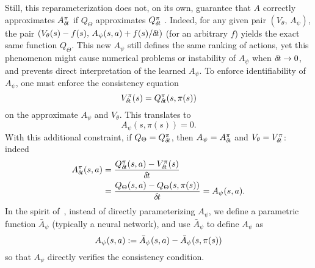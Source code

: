 Still, this reparameterization does not, on its own, guarantee that $A$
correctly approximates $A^\pi_{\delta\hspace{-.1em}t}$ if
$Q_\Theta$ approximates $Q^\pi_{\delta\hspace{-.1em}t}$%
.
Indeed, for any given pair $(V_\theta,\,A_\psi)$, the pair $(V_\theta(s) -
f(s),\,A_\psi(s,a)+f(s)/{\delta\hspace{-.1em}t})$ (for an arbitrary $f$)
yields the exact same function $Q_\Theta$. This new $A_\psi$ still defines %
the same ranking of actions, yet this phenomenon might cause
numerical problems or instability of $A_\psi$ when ${\delta\hspace{-.1em}t}\to 0$, and prevents direct
interpretation of the learned $A_\psi$.
To enforce identifiability of $A_\psi$, one must enforce the consistency equation
\begin{equation}
	V^\pi_{\delta\hspace{-.1em}t}(s) = Q^\pi_{\delta\hspace{-.1em}t}(s,
	\pi(s))
\end{equation}
on the approximate $A_\psi$ and $V_\theta$. This translates to
\begin{equation}
	A_\psi(s, \pi(s)) = 0.
\end{equation}
With this additional constraint, if $Q_\Theta = Q^\pi_{\delta\hspace{-.1em}t}$, then $A_\psi =
A^\pi_{\delta\hspace{-.1em}t}$ and $V_\theta = V^\pi_{\delta\hspace{-.1em}t}$: indeed
\begin{align}
	A^\pi_{\delta\hspace{-.1em}t}(s, a) &= \frac{Q^\pi_{\delta\hspace{-.1em}t}(s,a) - V^\pi_{\delta\hspace{-.1em}t}(s)}{{\delta\hspace{-.1em}t}}\\
		    &= \frac{Q_\Theta(s,a) - Q_\Theta(s, \pi(s))}{{\delta\hspace{-.1em}t}}
		    = A_\psi(s, a).
\end{align}
In the spirit of~\cite{dueling_nets}, instead of directly parameterizing $A_\psi$,
we define a parametric function $\bar{A}_\psi$ (typically a neural network),
and use $\bar{A}_\psi$ to define $A_\psi$ as
\begin{equation}
\label{eq:Aparam}
	A_\psi(s, a) \mathrel{\mathop{:}}= \bar{A}_\psi(s, a) - \bar{A}_\psi(s, \pi(s))
\end{equation}
so that $A_\psi$ directly verifies the consistency condition.

